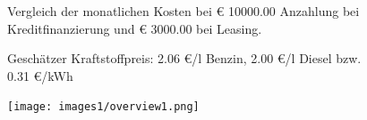 \documentclass[landscape, DIV=99, 14pt]{scrartcl}
\begin{document}
\pagebreak



\pagebreak

\onecolumn
\begin{figure}
\centering
Vergleich der monatlichen Kosten bei \euro{} 10000.00 Anzahlung bei Kreditfinanzierung und \euro{} 3000.00 bei Leasing.

Gesch\"atzer Kraftstoffpreis: 2.06 \euro{}/l Benzin, 2.00 \euro{}/l Diesel bzw. 0.31 \euro{}/kWh


\vspace{1em}
\texttt{[image: images1/overview1.png]}
\end{figure}
\vfill 
\end{document}
